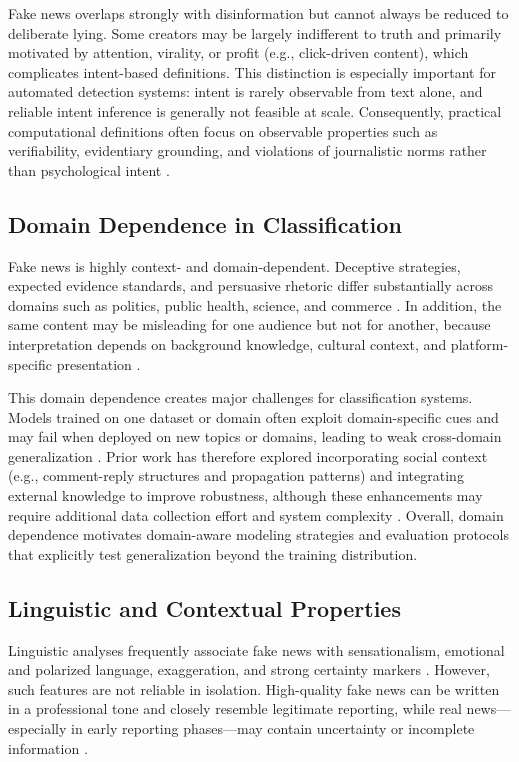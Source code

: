 Fake news overlaps strongly with disinformation but cannot always be reduced to deliberate lying. Some creators may be largely indifferent to truth and primarily motivated by attention, virality, or profit (e.g., click-driven content), which complicates intent-based definitions. This distinction is especially important for automated detection systems: intent is rarely observable from text alone, and reliable intent inference is generally not feasible at scale. Consequently, practical computational definitions often focus on observable properties such as verifiability, evidentiary grounding, and violations of journalistic norms rather than psychological intent \cite{encyclopedia2010043}.

\subsection{Domain Dependence in Classification}

Fake news is highly context- and domain-dependent. Deceptive strategies, expected evidence standards, and persuasive rhetoric differ substantially across domains such as politics, public health, science, and commerce \cite{encyclopedia2010043,tong-etal-2025-generate}. In addition, the same content may be misleading for one audience but not for another, because interpretation depends on background knowledge, cultural context, and platform-specific presentation \cite{encyclopedia2010043}.

This domain dependence creates major challenges for classification systems. Models trained on one dataset or domain often exploit domain-specific cues and may fail when deployed on new topics or domains, leading to weak cross-domain generalization \cite{tong-etal-2025-generate}. Prior work has therefore explored incorporating social context (e.g., comment-reply structures and propagation patterns) and integrating external knowledge to improve robustness, although these enhancements may require additional data collection effort and system complexity \cite{tong-etal-2025-generate}. Overall, domain dependence motivates domain-aware modeling strategies and evaluation protocols that explicitly test generalization beyond the training distribution.

\subsection{Linguistic and Contextual Properties}

Linguistic analyses frequently associate fake news with sensationalism, emotional and polarized language, exaggeration, and strong certainty markers \cite{encyclopedia2010043,10704605}. However, such features are not reliable in isolation. High-quality fake news can be written in a professional tone and closely resemble legitimate reporting, while real news—especially in early reporting phases—may contain uncertainty or incomplete information \cite{encyclopedia2010043}.

